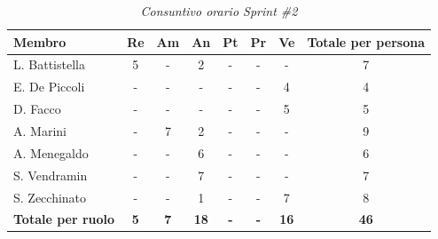 ﻿\documentclass[a4paper, 10pt, colorlinks=true, linkcolor=black, urlcolor=blue, citecolor=blue, hidelinks]{article}
\renewcommand{\arraystretch}{1.2}
\begin{document}
\begin{table}[H]
    \centering
    \renewcommand{\arraystretch}{1.4}
    \begin{tabular}{|l|c|c|c|c|c|c|c|}
        \hline
        \rowcolor{bluBitless!15}
        \textbf{Membro} & \textbf{Re} & \textbf{Am} & \textbf{An} & \textbf{Pt} & \textbf{Pr} & \textbf{Ve} & \textbf{Totale per persona} \\
        \hline
        L. Battistella & 5 & - & 2 & - & - & - & 7 \\ \hline
        E. De Piccoli & - & - & - & - & - & 4 & 4 \\ \hline
        D. Facco & - & - & - & - & - & 5 & 5 \\ \hline
        A. Marini & - & 7 & 2 & - & - & - & 9 \\ \hline
        A. Menegaldo & - & - & 6 & - & - & - & 6 \\ \hline
        S. Vendramin & - & - & 7 & - & - & - & 7 \\ \hline
        S. Zecchinato & - & - & 1 & - & - & 7 & 8 \\ \hline
        \rowcolor{bluBitless!8}
        \textbf{Totale per ruolo} & \textbf{5} & \textbf{7} & \textbf{18} & \textbf{-} & \textbf{-} & \textbf{16} & \textbf{46} \\
        \hline
    \end{tabular}
    \caption{\textit{Consuntivo orario Sprint \#2}}
\end{table}
\end{document}

